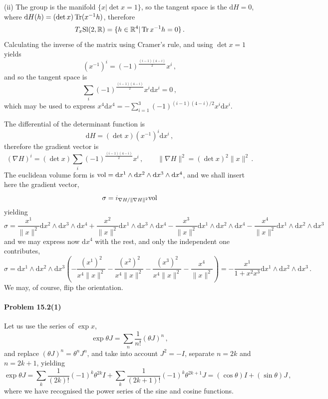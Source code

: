 \documentclass[a4paper,12pt]{article}
\def\d{\mathrm{d}}
\def\Tr{\ensuremath{\mathop{\rm Tr}}}
\newcommand{\problem}[1]{\paragraph{Problem #1}}
\begin{document}
(ii) The group is the manifold $\{x | \det x = 1\}$, so the tangent space is the $\d H =0$, where $\d H (h) = (\det x) \Tr(x^{-1} h)$, therefore
\[
 T_x {\rm Sl}(2, \mathbb{R}) = \{h\in \mathbb{R}^4| \Tr x^{-1}h =0 \}\,.
\]
Calculating the inverse of the matrix using Cramer's rule, and using $\det x =1$ yields
\[
 ( x^{-1} )^i = (-1)^{\frac{(i-1)(4-i)}{2}}x^i\,,
\]
and so the tangent space is
\[
 \sum_i (-1)^{\frac{(i-1)(4-i)}{2}}x^i \d x^i = 0\,,
\]
which may be used to express $x^4\d x^4 = -\sum_{i=1}^3 (-1)^{(i-1)(4-i)/2} x^i \d x^i$.

The differential of the determinant function is
\[
 \d H = (\det x)(x^{-1})^i \d x^i\,,
\]
therefore the gradient vector is
\[
 (\nabla H)^i = (\det x) \sum_i (-1)^{\frac{(i-1)(4-i)}{2}}x^i\,,\quad\quad \|\nabla H\|^2 = (\det x)^2 \|x\|^2\,.
\]
The euclidean volume form is ${\rm vol} = \d x^1\wedge \d x^2 \wedge \d x^3 \wedge \d x^4$, and we shall insert here the gradient vector,
\[
 \sigma = i_{\nabla H/\|\nabla H\|^2}{\rm vol}
\]
yielding
\[
 \sigma=\frac{x^1}{\|x\|^2} \d x^2 \wedge \d x^3 \wedge \d x^4 + \frac{x^2}{\|x\|^2}\d x^1 \wedge \d x^3 \wedge \d x^4 - \frac{x^3}{\|x\|^2} \d x^1 \wedge \d x^2 \wedge \d x^4 - \frac{x^4}{\|x\|^2}\d x^1 \wedge \d x^2 \wedge \d x^3
\]
and we may express now $\d x^4$ with the rest, and only the independent one contributes,
\[
 \sigma = \d x^1 \wedge \d x^2 \wedge \d x^3 \left( -\frac{(x^1)^2}{x^4\|x\|^2} - \frac{(x^2)^2}{x^4 \|x\|^2} -\frac{(x^3)^2}{x^4 \|x\|^2} - \frac{x^4}{\|x\|^2}\right) = -\frac{x^1}{1+x^2 x^3}\d x^1 \wedge \d x^2 \wedge \d x^3\,.
\]
We may, of course, flip the orientation.


\problem{15.2(1)} Let us use the series of $\exp x$,
\[
 \exp \theta J = \sum_n \frac{1}{n!}(\theta J)^n\,,
\]
and replace $(\theta J)^n = \theta^n J^n$, and take into account $J^2=-I$, separate $n=2k$ and $n=2k+1$, yielding
\[
 \exp\theta J = \sum_k \frac{1}{(2k)!}(-1)^k \theta^{2k} I + \sum_k \frac{1}{(2k+1)!} (-1)^k \theta^{2k+1} J = (\cos\theta)I+(\sin\theta)J\,,
\]
where we have recognised the power series of the sine and cosine functions.

\end{document}
